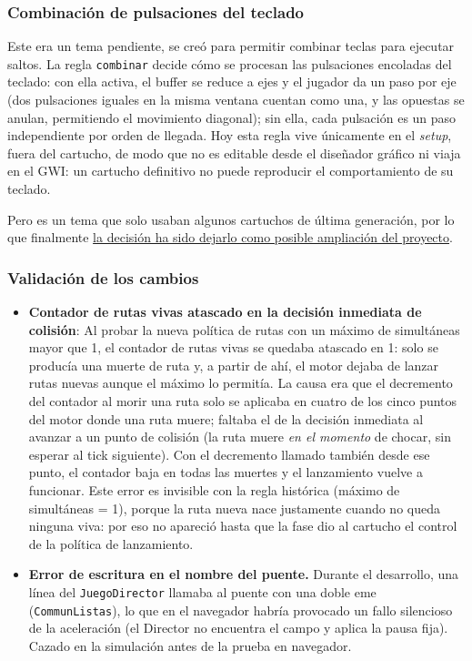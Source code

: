 \subsubsection{Combinación de pulsaciones del teclado}
Este era un tema pendiente, se creó para permitir combinar teclas para ejecutar saltos. La regla \texttt{combinar} decide cómo se procesan las pulsaciones encoladas del teclado: con ella activa, el buffer se reduce a ejes y el jugador da un paso por eje (dos pulsaciones iguales en la misma ventana cuentan como una, y las opuestas se anulan, permitiendo el movimiento diagonal); sin ella, cada pulsación es un paso independiente por orden de llegada. Hoy esta regla vive únicamente en el \emph{setup}, fuera del cartucho, de modo que no es editable desde el diseñador gráfico ni viaja en el GWI: un cartucho definitivo no puede reproducir el comportamiento de su teclado.

Pero es un tema que solo usaban algunos cartuchos de última generación, por lo que finalmente \underline{la decisión ha sido dejarlo como posible ampliación del proyecto}.

\subsubsection{Validación de los cambios}

\begin{itemize}
	\item \textbf{Contador de rutas vivas atascado en la decisión inmediata
		de colisión}: Al probar la nueva política de rutas con un máximo de
	simultáneas mayor que 1, el contador de rutas vivas se quedaba
	atascado en 1: solo se producía una muerte de ruta y, a partir de ahí,
	el motor dejaba de lanzar rutas nuevas aunque el máximo lo permitía.
	La causa era que el decremento del contador al morir una ruta solo
	se aplicaba en cuatro de los cinco puntos del motor donde una ruta
	muere; faltaba el de la decisión inmediata al avanzar a un punto de
	colisión (la ruta muere \emph{en el momento} de chocar, sin esperar al
	tick siguiente). Con el decremento llamado también desde ese punto, el
	contador baja en todas las muertes y el lanzamiento vuelve a
	funcionar. Este error es invisible con la regla histórica (máximo de
	simultáneas = 1), porque la ruta nueva nace justamente cuando no queda
	ninguna viva: por eso no apareció hasta que la fase dio al cartucho el
	control de la política de lanzamiento.
	
	\item \textbf{Error de escritura en el nombre del puente.} Durante el
	desarrollo, una línea del \texttt{JuegoDirector} llamaba al puente con
	una doble eme (\texttt{CommunListas}), lo que en el navegador habría
	provocado un fallo silencioso de la aceleración (el Director no
	encuentra el campo y aplica la pausa fija). Cazado en la simulación
	antes de la prueba en navegador.
\end{itemize}